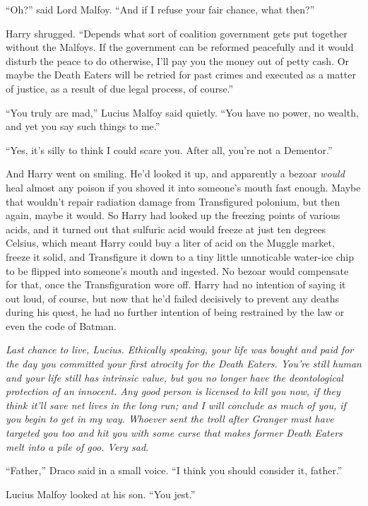 ``Oh?'' said Lord Malfoy. ``And if I refuse your fair chance, what then?''

Harry shrugged. ``Depends what sort of coalition government gets put together without the Malfoys. If the government can be reformed peacefully and it would disturb the peace to do otherwise, I'll pay you the money out of petty cash. Or maybe the Death Eaters will be retried for past crimes and executed as a matter of justice, as a result of due legal process, of course.''

``You truly are mad,'' Lucius Malfoy said quietly. ``You have no power, no wealth, and yet you say such things to me.''

``Yes, it's silly to think I could scare you. After all, you're not a Dementor.''

And Harry went on smiling. He'd looked it up, and apparently a bezoar \emph{would} heal almost any poison if you shoved it into someone's mouth fast enough. Maybe that wouldn't repair radiation damage from Transfigured polonium, but then again, maybe it would. So Harry had looked up the freezing points of various acids, and it turned out that sulfuric acid would freeze at just ten degrees Celsius, which meant Harry could buy a liter of acid on the Muggle market, freeze it solid, and Transfigure it down to a tiny little unnoticable water-ice chip to be flipped into someone's mouth and ingested. No bezoar would compensate for that, once the Transfiguration wore off. Harry had no intention of saying it out loud, of course, but now that he'd failed decisively to prevent any deaths during his quest, he had no further intention of being restrained by the law or even the code of Batman.

\emph{Last chance to live, Lucius. Ethically speaking, your life was bought and paid for the day you committed your first atrocity for the Death Eaters. You're still human and your life still has intrinsic value, but you no longer have the deontological protection of an innocent. Any good person is licensed to kill you now, if they think it'll save net lives in the long run; and I will conclude as much of you, if you begin to get in my way. Whoever sent the troll after Granger must have targeted you too and hit you with some curse that makes former Death Eaters melt into a pile of goo. Very sad.}

``Father,'' Draco said in a small voice. ``I think you should consider it, father.''

Lucius Malfoy looked at his son. ``You jest.''

